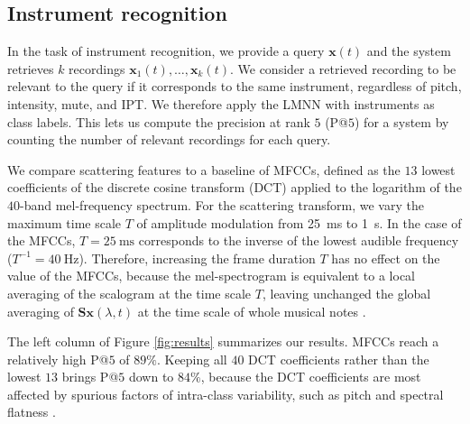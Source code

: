 

\subsection{Instrument recognition}

In the task of instrument recognition, we provide a query $\boldsymbol{x} (t)$ and the system retrieves $k$ recordings $\boldsymbol{x}_1 (t), \ldots, \boldsymbol{x}_k (t)$.
We consider a retrieved recording to be relevant to the query if it corresponds to the same instrument, regardless of pitch, intensity, mute, and IPT. We therefore apply the LMNN with instruments as class labels. This lets us compute the precision at rank $5$ (P@$5$) for a system by counting the number of relevant recordings for each query.

We compare scattering features to a baseline of MFCCs, defined as the $13$ lowest coefficients of the discrete cosine transform (DCT) applied to the logarithm of the $40$-band mel-frequency spectrum.
For the scattering transform, we vary the maximum time scale $T$ of amplitude modulation from \SI{25}{\milli\second} to \SI{1}{\second}.
In the case of the MFCCs, $T=\SI{25}{\milli\second}$ corresponds to the inverse of the lowest audible frequency ($T^{-1}=\SI{40}{\Hz}$).
Therefore, increasing the frame duration $T$ has no effect on the value of the MFCCs, because the mel-spectrogram is equivalent to a local averaging of the scalogram at the time scale $T$, leaving unchanged the global averaging of $\mathbf{S}\boldsymbol{x}(\lambda, t)$ at the time scale of whole musical notes \cite[section II.B]{anden2012dafx}.

The left column of Figure \ref{fig:results} summarizes our results.
MFCCs reach a relatively high P@$5$ of $89\%$.
Keeping all $40$ DCT coefficients rather than the lowest $13$ brings P@$5$ down to $84\%$, because the DCT coefficients are most affected by spurious factors of intra-class variability, such as pitch and spectral flatness \cite[subsection 2.3.3]{lostanlen2017phd}.

